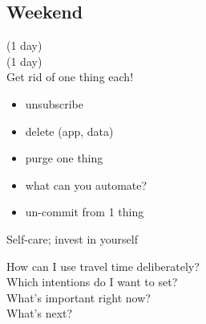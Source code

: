 \begin{landscape}

\section{Weekend}

\begin{minipage}[t]{0.55\textwidth}

\begin{minipage}[t]{0.5\textwidth}
  (1 day) \\[3em]
 (1 day) \\[2em]


Get rid of one thing each!
\begin{itemize}\footnotesize
    \item unsubscribe
    \item delete (app, data)
    \item purge one thing
    \item what can you automate?
    \item un-commit from 1 thing
\end{itemize}

{\footnotesize Self-care; invest in yourself}\\[1em]


\end{minipage}\hfill 
\begin{minipage}[t]{0.45\textwidth}


{\footnotesize How can I use travel time deliberately?}\\[3em]

{\footnotesize Which intentions do I want to set?}\\[3em]

What's important right now?\\[3em]

What's next?\\[1em]

\end{minipage}

\begin{minipage}[t]{0.45\textwidth}
 \\[0.5em]
\timebucket \\
\timebucket \\
\timebucket \\
\end{minipage}\hfill 
\begin{minipage}[t]{0.45\textwidth}
 \\[0.5em]
\timebucket \\
\timebucket
\end{minipage}\hfill 


\end{minipage}
\end{landscape}
